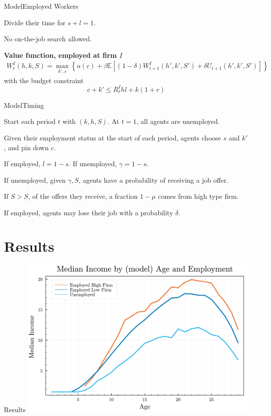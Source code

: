 \documentclass[notes, 10pt]{beamer}
\newenvironment{wideitemize}{\itemize\addtolength{\itemsep}{10pt}}{\enditemize}
\newenvironment{wideenumerate}{\enumerate\addtolength{\itemsep}{10pt}}{\endenumerate}
\begin{document}
	\begin{frame}{Model}{Employed Workers}
		\begin{wideitemize}
			\item Divide their time for $ s + l = 1 $.
			\item No on-the-job search allowed.
		\end{wideitemize}

		\vspace{0.5cm}
		
		\textbf{Value function, employed at firm $I$}
		\begin{align*}
			W^I_t(h,k,S) =  \max_{k',s} \left\{ u(c) + \beta\mathbb{E}\left[ (1 - \delta) W^I_{t+1}(h',k',S')
			+ \delta  U_{t+1}(h',k',S')  \right] \right\}
		\end{align*}
		with the budget constraint \[   c + k' \leq R^I_t h l + k(1 +r) \]
	\end{frame}

	\begin{frame}{Model}{Timing}
		\begin{wideenumerate}
			\item Start each period $t$ with $(k,h,S)$. At $t=1$, all agents are unemployed.
			\item Given their employment status at the start of each period, agents choose $s$ and $k'$, and pin down $c$.
			\item If employed, $l = 1 - s$. If unemployed, $\gamma = 1 - s$.
			\item If unemployed, given $\gamma, S$, agents have a probability of receiving a job offer.
			\item If $S > \underbar{S}$, of the offers they receive, a fraction $1 - \mu$ comes from high type firm.
			\item If employed, agents may lose their job with a probability $\delta$.
		\end{wideenumerate}
	\end{frame}
	
	\section{Results}
	\begin{frame}{Results}{}
		 \centering
        \includegraphics[width=12cm]{Figures/fig_median_income_by_age_and_employment_sim_data_v1.pdf}
	\end{frame}
\end{document}
